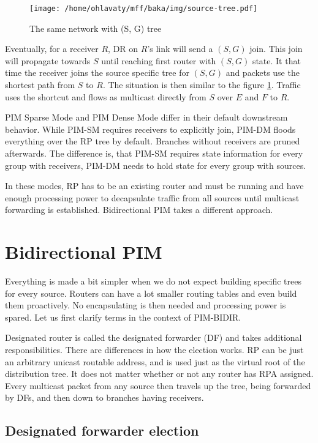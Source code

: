 \begin{figure}[htp]
\centering
\texttt{[image: /home/ohlavaty/mff/baka/img/source-tree.pdf]}
\caption{The same network with (S, G) tree}
\label{sg-tree}
\end{figure}

Eventually, for a receiver $R$, DR on $R$'s link will send a $(S, G)$ join.
This join will propagate towards $S$ until reaching first router with $(S,G)$
state. It that time the receiver joins the source specific tree for $(S,G)$ and
packets use the shortest path from $S$ to $R$. The situation is then similar to
the figure \ref{sg-tree}. Traffic uses the shortcut and flows as multicast
directly from $S$ over $E$ and $F$ to $R$.

PIM Sparse Mode and PIM Dense Mode differ in their default downstream behavior.
While PIM-SM requires receivers to explicitly join, PIM-DM floods everything
over the RP tree by default. Branches without receivers are pruned afterwards.
The difference is, that PIM-SM requires state information for every group with
receivers, PIM-DM needs to hold state for every group with sources.

In these modes, RP has to be an existing router and must be running and have
enough processing power to decapsulate traffic from all sources until multicast
forwarding is established. Bidirectional PIM takes a different approach.

\section{Bidirectional PIM}

Everything is made a bit simpler when we do not expect building specific trees
for every source. Routers can have a lot smaller routing tables and even build
them proactively. No encapsulating is then needed and processing power is
spared. Let us first clarify terms in the context of PIM-BIDIR.

Designated router is called the designated forwarder (DF) and takes additional
responsibilities. There are differences in how the election works. RP can be
just an arbitrary unicast routable address, and is used just as the virtual root of the
distribution tree. It does not matter whether or not any router has RPA
assigned. Every multicast packet from any source then travels up the tree,
being forwarded by DFs, and then down to branches having receivers.

\subsection{Designated forwarder election}

